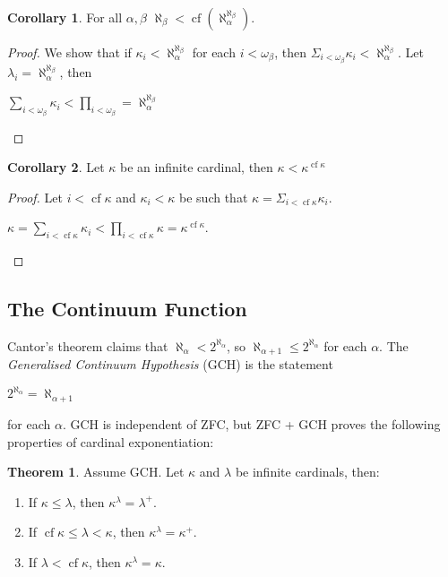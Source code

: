 \documentclass[8pt]{article}
\theoremstyle{definition}
\theoremstyle{definition}
\newtheorem{theorem}{Theorem}[section]
\theoremstyle{definition}
\theoremstyle{definition}
\theoremstyle{definition}
\theoremstyle{definition}
\theoremstyle{definition}
\theoremstyle{definition}
\theoremstyle{definition}
\theoremstyle{definition}
\theoremstyle{definition}
\theoremstyle{definition}
\theoremstyle{definition}
\theoremstyle{definition}
\newtheorem{col}{Corollary}[section]
\theoremstyle{question}
\begin{document}
\begin{col}
  For all $\alpha, \beta$ $\aleph_{\beta} < \operatorname{cf}(\aleph_{\alpha}^{\aleph_{\beta}})$.
\end{col}

\begin{proof}
  We show that if $\kappa_i < \aleph_{\alpha}^{\aleph_{\beta}}$ for each 
  $i < \omega_{\beta}$, then $\Sigma_{i < \omega_{\beta}} \kappa_i < \aleph_{\alpha}^{\aleph_{\beta}}$.
  Let $\lambda_i = \aleph_{\alpha}^{\aleph_{\beta}}$, then
  \begin{center}
    $\sum \limits_{i < \omega_{\beta}} \kappa_i < \prod \limits_{i < \omega_{\beta}} = \aleph_{\alpha}^{\aleph_{\beta}}$
  \end{center}
\end{proof}

\begin{col}
  Let $\kappa$ be an infinite cardinal, then $\kappa < \kappa^{\operatorname{cf} \kappa}$
\end{col}

\begin{proof}
  Let $i < \operatorname{cf} \kappa$ and $\kappa_i < \kappa$ be such that $\kappa = \Sigma_{i < \operatorname{cf} \kappa} \kappa_i$.
  \begin{center}
    $\kappa = \sum \limits_{i < \operatorname{cf} \kappa} \kappa_i < \prod \limits_{i < \operatorname{cf} \kappa} \kappa = \kappa^{\operatorname{cf} \kappa}$.
  \end{center}
\end{proof}

\subsection{The Continuum Function}

Cantor's theorem claims that $\aleph_{\alpha} < 2^{\aleph_{\alpha}}$, so $\aleph_{\alpha+1} \leq 2^{\aleph_{\alpha}}$
for each $\alpha$. The \emph{Generalised Continuum Hypothesis} (GCH) is the statement
\begin{center}
  $2^{\aleph_{\alpha}} = \aleph_{\alpha+1}$
\end{center}
for each $\alpha$. GCH is independent of ZFC, but ZFC + GCH proves the following properties of
cardinal exponentiation:
\begin{theorem} Assume GCH. Let $\kappa$ and $\lambda$ be infinite cardinals, then:

  \begin{enumerate}
    \item If $\kappa \leq \lambda$, then $\kappa^{\lambda} = \lambda^{+}$.
    \item If $\operatorname{cf} \kappa \leq \lambda < \kappa$, then $\kappa^{\lambda} = \kappa^{+}$.
    \item If $\lambda < \operatorname{cf} \kappa$, then $\kappa^{\lambda} = \kappa$.
  \end{enumerate}
\end{theorem}
\end{document}
